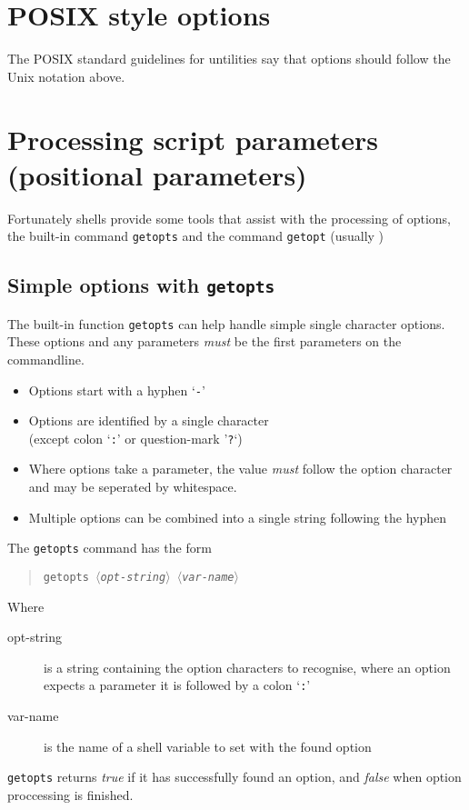 \documentclass{article}
\newcommand{\required}[1]{$\langle$\itshape #1$\rangle$}
\begin{document}
\section{POSIX style options}
The POSIX standard guidelines for untilities say that options should follow the Unix notation above.
\section{Processing script parameters (positional parameters)}
Fortunately shells provide some tools that assist with the processing of options, the built-in command \verb'getopts' and the command \verb'getopt'  (usually )

\subsection{Simple options with \texttt{getopts}}
The built-in function \texttt{getopts} can help handle simple single character options.  These options and any parameters \emph{must} be the first parameters on the commandline.

\begin{itemize}
  \item Options start with a hyphen `\texttt{-}'
  \item Options are identified by a single character \\
        (except colon `\texttt{:}' or question-mark '\texttt{?}`)
  \item Where options take a parameter, the value \emph{must} follow the option character and may be seperated by whitespace.
  \item Multiple options can be combined into a single string following the hyphen
\end{itemize}

The \texttt{getopts} command has the form
\begin{quote}
\texttt{getopts \required{opt-string} \required{var-name}}
\end{quote}
Where
\begin{description}
  \item[opt-string] is a string containing the option characters to recognise, where an option expects a parameter it is followed by a colon `\texttt{:}'
  \item[var-name] is the name of a shell variable to set with the found option
\end{description}
\texttt{getopts} returns \textit{true} if it has successfully found an option, and \textit{false} when option proccessing is finished.
\end{document}
